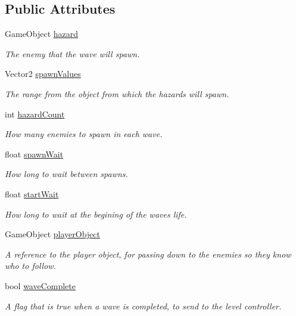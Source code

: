 \subsection*{Public Attributes}
\begin{DoxyCompactItemize}
\item 
Game\+Object \mbox{\hyperlink{class_wave_behavior_a6890b5a829fbd0d27517b75ab3e9fa12}{hazard}}
\begin{DoxyCompactList}\small\item\em The enemy that the wave will spawn. \end{DoxyCompactList}\item 
Vector2 \mbox{\hyperlink{class_wave_behavior_ae26807be7d4406478efc4886aa610189}{spawn\+Values}}
\begin{DoxyCompactList}\small\item\em The range from the object from which the hazards will spawn. \end{DoxyCompactList}\item 
int \mbox{\hyperlink{class_wave_behavior_a3790e0815c8d88a71e77e3227b050b42}{hazard\+Count}}
\begin{DoxyCompactList}\small\item\em How many enemies to spawn in each wave. \end{DoxyCompactList}\item 
float \mbox{\hyperlink{class_wave_behavior_a401c9221c61cc6b50bc1d538b5365555}{spawn\+Wait}}
\begin{DoxyCompactList}\small\item\em How long to wait between spawns. \end{DoxyCompactList}\item 
float \mbox{\hyperlink{class_wave_behavior_ae8cd1f5cb102b67698fd4043bf2314d2}{start\+Wait}}
\begin{DoxyCompactList}\small\item\em How long to wait at the begining of the wave\textquotesingle{}s life. \end{DoxyCompactList}\item 
Game\+Object \mbox{\hyperlink{class_wave_behavior_a97c0d24bc7af3d86d245206339a04d1f}{player\+Object}}
\begin{DoxyCompactList}\small\item\em A reference to the player object, for passing down to the enemies so they know who to follow. \end{DoxyCompactList}\item 
bool \mbox{\hyperlink{class_wave_behavior_a32d9c8126e7d2cf877476eca635f50c6}{wave\+Complete}}
\begin{DoxyCompactList}\small\item\em A flag that is true when a wave is completed, to send to the level controller. \end{DoxyCompactList}\end{DoxyCompactItemize}


